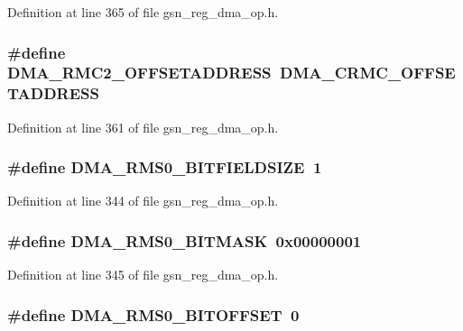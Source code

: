 Definition at line 365 of file gsn\_\-reg\_\-dma\_\-op.h.

\hypertarget{a00547_a274aa4d9df3d885c6f22ab728c344cc6}{
\subsubsection[{DMA\_\-RMC2\_\-OFFSETADDRESS}]{\setlength{\rightskip}{0pt plus 5cm}\#define DMA\_\-RMC2\_\-OFFSETADDRESS~DMA\_\-CRMC\_\-OFFSETADDRESS}}
\label{a00547_a274aa4d9df3d885c6f22ab728c344cc6}


Definition at line 361 of file gsn\_\-reg\_\-dma\_\-op.h.

\hypertarget{a00547_aa01b985a3b6babbd3ec5c020fe03662a}{
\subsubsection[{DMA\_\-RMS0\_\-BITFIELDSIZE}]{\setlength{\rightskip}{0pt plus 5cm}\#define DMA\_\-RMS0\_\-BITFIELDSIZE~1}}
\label{a00547_aa01b985a3b6babbd3ec5c020fe03662a}


Definition at line 344 of file gsn\_\-reg\_\-dma\_\-op.h.

\hypertarget{a00547_af253ac96297350671140c674f6c04b98}{
\subsubsection[{DMA\_\-RMS0\_\-BITMASK}]{\setlength{\rightskip}{0pt plus 5cm}\#define DMA\_\-RMS0\_\-BITMASK~0x00000001}}
\label{a00547_af253ac96297350671140c674f6c04b98}


Definition at line 345 of file gsn\_\-reg\_\-dma\_\-op.h.

\hypertarget{a00547_a6ebf67c449c9c00749228c4f304fb640}{
\subsubsection[{DMA\_\-RMS0\_\-BITOFFSET}]{\setlength{\rightskip}{0pt plus 5cm}\#define DMA\_\-RMS0\_\-BITOFFSET~0}}
\label{a00547_a6ebf67c449c9c00749228c4f304fb640}


